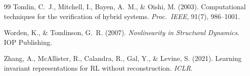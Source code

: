 \documentclass[10pt,twocolumn]{article}
\theoremstyle{plain}
\theoremstyle{definition}
\theoremstyle{remark}
\begin{document}
\begin{thebibliography}{99}
Tomlin, C.~J., Mitchell, I., Bayen, A.~M., \& Oishi, M. (2003).
Computational techniques for the verification of hybrid systems.
\textit{Proc.\ IEEE}, 91(7), 986--1001.

Worden, K., \& Tomlinson, G.~R. (2007).
\textit{Nonlinearity in Structural Dynamics}.
IOP Publishing.

Zhang, A., McAllister, R., Calandra, R., Gal, Y., \& Levine, S. (2021).
Learning invariant representations for RL without reconstruction.
\textit{ICLR}.

\end{thebibliography}
\end{document}
